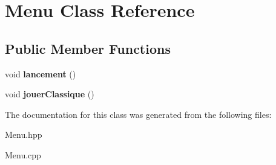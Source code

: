 \hypertarget{classMenu}{}\section{Menu Class Reference}
\label{classMenu}
\subsection*{Public Member Functions}
\begin{DoxyCompactItemize}
\item 
\mbox{\label{classMenu_af5b4e2c6b75f8cddd6fbcc2698f6d289}} 
void {\bfseries lancement} ()
\item 
\mbox{\label{classMenu_a4d96a32e4552d6dfab24c18dea8c1a5e}} 
void {\bfseries jouer\+Classique} ()
\end{DoxyCompactItemize}


The documentation for this class was generated from the following files\+:\begin{DoxyCompactItemize}
\item 
Menu.\+hpp\item 
Menu.\+cpp\end{DoxyCompactItemize}
